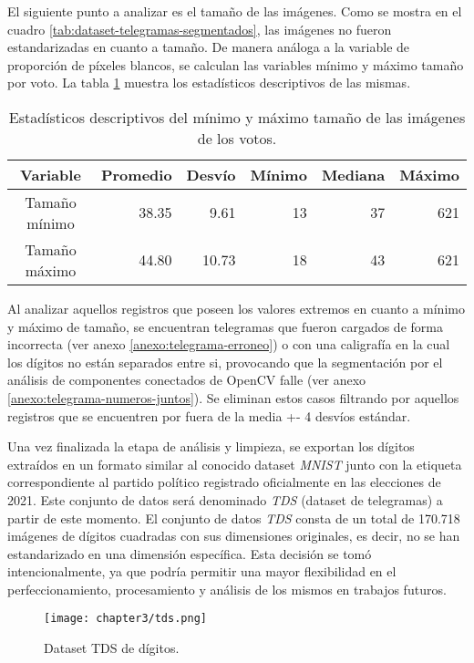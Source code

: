 El siguiente punto a analizar es el tamaño de las imágenes. Como se mostra en el cuadro
\ref{tab:dataset-telegramas-segmentados}, las imágenes no fueron estandarizadas en cuanto a tamaño. De manera análoga a
la variable de proporción de píxeles blancos, se calculan las variables mínimo y máximo tamaño por voto. La tabla
\ref{tab:describe-min-max-size} muestra los estadísticos descriptivos de las mismas.

\begin{table}[H]
    \centering
    \begin{tabular}{crrrrr}
        \toprule
        Variable      & Promedio & Desvío & Mínimo & Mediana & Máximo \\
        \midrule
        Tamaño mínimo & 38.35    & 9.61   & 13     & 37      & 621    \\
        Tamaño máximo & 44.80    & 10.73  & 18     & 43      & 621    \\
        \bottomrule
    \end{tabular}
    \caption{Estadísticos descriptivos del mínimo y máximo tamaño de las imágenes de los votos.}
    \label{tab:describe-min-max-size}
\end{table}

Al analizar aquellos registros que poseen los valores extremos en cuanto a mínimo y máximo de tamaño, se encuentran
telegramas que fueron cargados de forma incorrecta (ver anexo \ref{anexo:telegrama-erroneo}) o con una caligrafía en la
cual los dígitos no están separados entre si, provocando que la segmentación por el análisis de componentes conectados
de OpenCV falle (ver anexo \ref{anexo:telegrama-numeros-juntos}). Se eliminan estos casos filtrando por aquellos
registros que se encuentren por fuera de la media +- 4 desvíos estándar.

Una vez finalizada la etapa de análisis y limpieza, se exportan los dígitos extraídos en un formato similar al conocido
dataset {\it MNIST} junto con la etiqueta correspondiente al partido político registrado oficialmente en las elecciones
de 2021. Este conjunto de datos será denominado {\it TDS} (dataset de telegramas) a partir de este momento. El conjunto
de datos {\it TDS} consta de un total de 170.718 imágenes de dígitos cuadradas con sus dimensiones originales, es
decir, no se han estandarizado en una dimensión específica. Esta decisión se tomó intencionalmente, ya que podría
permitir una mayor flexibilidad en el perfeccionamiento, procesamiento y análisis de los mismos en trabajos futuros.

\begin{figure}[H]
    \centering
    \texttt{[image: chapter3/tds.png]}
    \caption{Dataset TDS de dígitos.}
    \label{fig:tds}
\end{figure}

